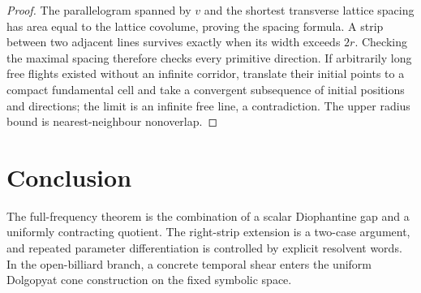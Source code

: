 \documentclass[11pt,reqno]{amsart}
\theoremstyle{definition}
\theoremstyle{remark}
\begin{document}
\begin{proof}
The parallelogram spanned by $v$ and the shortest transverse lattice spacing
has area equal to the lattice covolume, proving the spacing formula.  A strip
between two adjacent lines survives exactly when its width exceeds $2r$.
Checking the maximal spacing therefore checks every primitive direction.  If
arbitrarily long free flights existed without an infinite corridor, translate
their initial points to a compact fundamental cell and take a convergent
subsequence of initial positions and directions; the limit is an infinite free
line, a contradiction.  The upper radius bound is nearest-neighbour
nonoverlap.
\end{proof}

\section{Conclusion}

The full-frequency theorem is the combination of a scalar Diophantine gap and
a uniformly contracting quotient.  The right-strip extension is a two-case
argument, and repeated parameter differentiation is controlled by explicit
resolvent words.  In the open-billiard branch, a concrete temporal shear enters
the uniform Dolgopyat cone construction on the fixed symbolic space.



\end{document}
